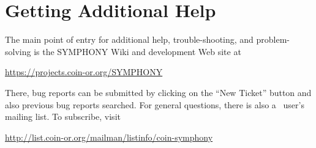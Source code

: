 \section{Getting Additional Help}
\label{resources}

The main point of entry for additional help, trouble-shooting, and
problem-solving is the SYMPHONY Wiki and development Web site at
\begin{center}
\url{https://projects.coin-or.org/SYMPHONY}
\end{center}
There, bug reports can be submitted by clicking on the ``New Ticket'' button
and also previous bug reports searched. For general questions, there is also a
\BB\ user's mailing list. To subscribe, visit
\begin{center}
\url{http://list.coin-or.org/mailman/listinfo/coin-symphony}
\end{center}


